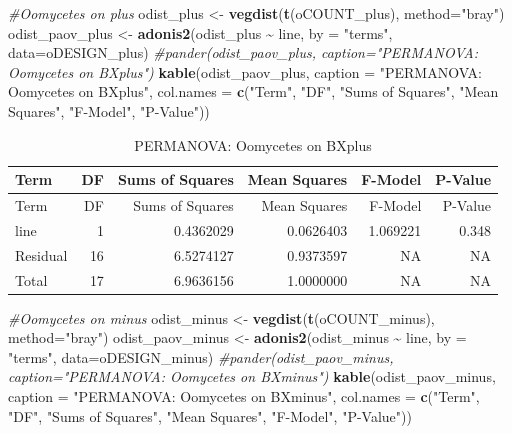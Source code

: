 \documentclass[
  11pt,
]{article}
\newenvironment{Shaded}{\begin{snugshade}}{\end{snugshade}}
\newcommand{\AttributeTok}[1]{\textcolor[rgb]{0.13,0.29,0.53}{#1}}
\newcommand{\CommentTok}[1]{\textcolor[rgb]{0.56,0.35,0.01}{\textit{#1}}}
\newcommand{\FunctionTok}[1]{\textcolor[rgb]{0.13,0.29,0.53}{\textbf{#1}}}
\newcommand{\NormalTok}[1]{#1}
\newcommand{\OtherTok}[1]{\textcolor[rgb]{0.56,0.35,0.01}{#1}}
\newcommand{\SpecialCharTok}[1]{\textcolor[rgb]{0.81,0.36,0.00}{\textbf{#1}}}
\newcommand{\StringTok}[1]{\textcolor[rgb]{0.31,0.60,0.02}{#1}}
\begin{document}
\begin{Shaded}
\begin{Highlighting}[]
\CommentTok{\#Oomycetes on plus}
\NormalTok{odist\_plus }\OtherTok{\textless{}{-}} \FunctionTok{vegdist}\NormalTok{(}\FunctionTok{t}\NormalTok{(oCOUNT\_plus), }\AttributeTok{method=}\StringTok{"bray"}\NormalTok{)}
\NormalTok{odist\_paov\_plus }\OtherTok{\textless{}{-}} \FunctionTok{adonis2}\NormalTok{(odist\_plus }\SpecialCharTok{\textasciitilde{}}\NormalTok{ line, }\AttributeTok{by =} \StringTok{"terms"}\NormalTok{, }\AttributeTok{data=}\NormalTok{oDESIGN\_plus)}
\CommentTok{\#pander(odist\_paov\_plus, caption="PERMANOVA: Oomycetes on BXplus")}
\FunctionTok{kable}\NormalTok{(odist\_paov\_plus, }\AttributeTok{caption =} \StringTok{"PERMANOVA: Oomycetes on BXplus"}\NormalTok{,}
      \AttributeTok{col.names =} \FunctionTok{c}\NormalTok{(}\StringTok{"Term"}\NormalTok{, }\StringTok{"DF"}\NormalTok{, }\StringTok{"Sums of Squares"}\NormalTok{, }\StringTok{"Mean Squares"}\NormalTok{, }\StringTok{"F{-}Model"}\NormalTok{, }\StringTok{"P{-}Value"}\NormalTok{))}
\end{Highlighting}
\end{Shaded}

\begin{longtable}[]{@{}lrrrrr@{}}
\caption{PERMANOVA: Oomycetes on BXplus}\tabularnewline
\toprule\noalign{}
Term & DF & Sums of Squares & Mean Squares & F-Model & P-Value \\
\midrule\noalign{}
\endfirsthead
\toprule\noalign{}
Term & DF & Sums of Squares & Mean Squares & F-Model & P-Value \\
\midrule\noalign{}
\endhead
\bottomrule\noalign{}
\endlastfoot
line & 1 & 0.4362029 & 0.0626403 & 1.069221 & 0.348 \\
Residual & 16 & 6.5274127 & 0.9373597 & NA & NA \\
Total & 17 & 6.9636156 & 1.0000000 & NA & NA \\
\end{longtable}

\begin{Shaded}
\begin{Highlighting}[]
\CommentTok{\#Oomycetes on minus}
\NormalTok{odist\_minus }\OtherTok{\textless{}{-}} \FunctionTok{vegdist}\NormalTok{(}\FunctionTok{t}\NormalTok{(oCOUNT\_minus), }\AttributeTok{method=}\StringTok{"bray"}\NormalTok{)}
\NormalTok{odist\_paov\_minus }\OtherTok{\textless{}{-}} \FunctionTok{adonis2}\NormalTok{(odist\_minus }\SpecialCharTok{\textasciitilde{}}\NormalTok{ line, }\AttributeTok{by =} \StringTok{"terms"}\NormalTok{, }\AttributeTok{data=}\NormalTok{oDESIGN\_minus)}
\CommentTok{\#pander(odist\_paov\_minus, caption="PERMANOVA: Oomycetes on BXminus")}
\FunctionTok{kable}\NormalTok{(odist\_paov\_minus, }\AttributeTok{caption =} \StringTok{"PERMANOVA: Oomycetes on BXminus"}\NormalTok{,}
      \AttributeTok{col.names =} \FunctionTok{c}\NormalTok{(}\StringTok{"Term"}\NormalTok{, }\StringTok{"DF"}\NormalTok{, }\StringTok{"Sums of Squares"}\NormalTok{, }\StringTok{"Mean Squares"}\NormalTok{, }\StringTok{"F{-}Model"}\NormalTok{, }\StringTok{"P{-}Value"}\NormalTok{))}
\end{Highlighting}
\end{Shaded}
\end{document}

